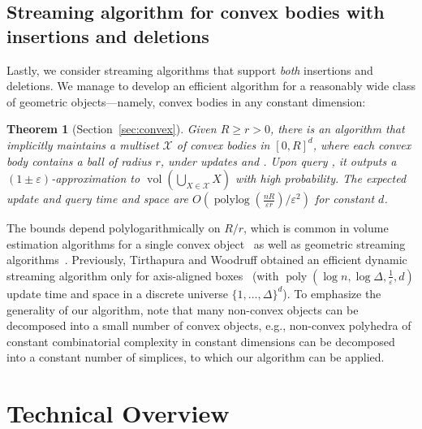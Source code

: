 \documentclass[11pt]{article}
\def\poly{\operatorname{poly}}
\def\polylog{\operatorname{polylog}}
\def\vol{\operatorname{vol}}		%
\newtheorem{theorem}{Theorem}[section]
\newcommand{\eps}{\varepsilon}
\newcommand{\class}[1]{\mathcal{#1}}
\begin{document}
\subsection{Streaming algorithm for convex bodies with insertions and deletions}
Lastly, we consider streaming algorithms that support \emph{both} insertions and deletions.
We manage to develop an efficient algorithm for a reasonably wide class of geometric objects---namely, convex bodies in any constant dimension:
%

\begin{theorem}[Section~\ref{sec:convex}]
\label{thm:convexalgo}
Given $R \ge r > 0$, there is an algorithm that implicitly maintains a multiset $\class{X}$ of convex bodies in $[0,R]^d$, where each convex body contains a ball of radius $r$, under updates  and . Upon query \est{}, it outputs a $(1\pm\eps)$-approximation to $\vol\left(\bigcup_{X \in \class{X}} X\right)$ with high probability. The expected update and query time and space are $O(\polylog(\frac{nR}{\eps r}) / \eps^2)$ for constant $d$.
\end{theorem}

%
The bounds depend polylogarithmically on $R/r$, which is common in volume estimation algorithms for a single convex object~\cite{DyerFK91} as well as geometric streaming algorithms~\cite{Indyk04,FrahlingIS08}.
%
Previously, Tirthapura and Woodruff obtained an efficient dynamic streaming algorithm only for axis-aligned boxes~\cite{TW12} (with $\poly(\log n, \log \Delta, \frac{1}{\eps}, d)$ update time and space in a discrete universe $\{1,\ldots,\Delta\}^d$).
To emphasize the generality of our algorithm, note that many non-convex objects can be decomposed into a small number of convex objects, e.g., non-convex polyhedra of constant combinatorial complexity in constant dimensions can be decomposed into a constant number of simplices, to which our algorithm can be  applied.
%
\section{Technical Overview}
%
\end{document}
